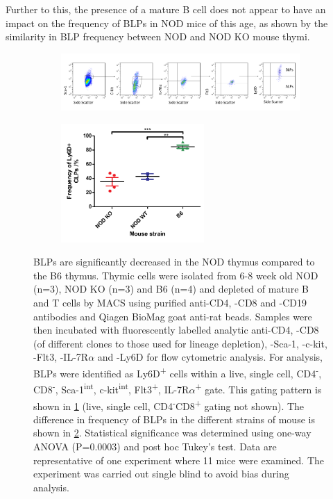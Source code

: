 Further to this, the presence of a mature B cell does not appear to have an impact on the frequency of BLPs in NOD mice of this age, as shown by the similarity in BLP frequency between NOD and NOD KO mouse thymi.


\begin{figure}
	\begin{subfigure}{\textwidth}
	\caption{}
	\includegraphics[width=\textwidth]{Figures/BLPgating.png}	
	\label{subfig:BLPgating}
	\end{subfigure}
	\begin{subfigure}{\textwidth}
	\centering
	\caption{}
	\includegraphics[width=0.6\textwidth]{Figures/Ly6D.pdf}	
	\label{subfig:BLPgraph}
	\end{subfigure}
\caption[BLPs are significantly decreased in the NOD thymus compared to the B6 thymus]{BLPs are significantly decreased in the NOD thymus compared to the B6 thymus.
Thymic cells were isolated from 6-8 week old NOD (n=3), NOD KO (n=3) and B6 (n=4) and depleted of mature B and T cells by MACS using purified anti-CD4, -CD8 and -CD19 antibodies and Qiagen BioMag goat anti-rat beads.
Samples were then incubated with fluorescently labelled analytic anti-CD4, -CD8 (of different clones to those used for lineage depletion), -Sca-1, -c-kit, -Flt3, -IL-7R$\alpha$ and -Ly6D for flow cytometric analysis.
For analysis, BLPs were identified as Ly6D\textsuperscript{+} cells within a live, single cell, CD4\textsuperscript{-}, CD8\textsuperscript{-}, Sca-1\textsuperscript{int}, c-kit\textsuperscript{int}, Flt3\textsuperscript{+}, IL-7R$\alpha$\textsuperscript{+} gate.
This gating pattern is shown in \ref{subfig:BLPgating} (live, single cell, CD4\textsuperscript{-}CD8\textsuperscript{+} gating not shown).
The difference in frequency of BLPs in the different strains of mouse is shown in \ref{subfig:BLPgraph}. Statistical significance was determined using one-way ANOVA (P=0.0003) and post hoc Tukey's test.
Data are representative of one experiment where 11 mice were examined.
The experiment was carried out single blind to avoid bias during analysis.}
\label{fig:BLPs}
\end{figure}

